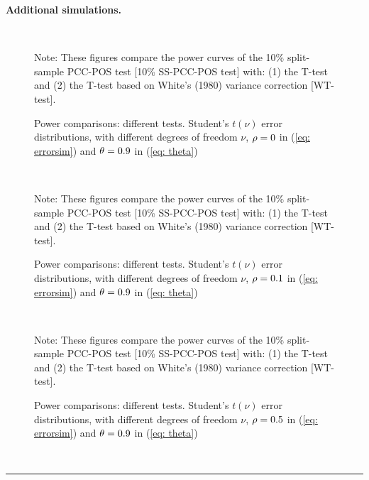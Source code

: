 \documentclass[harvard,11pt]{article}
\newenvironment{proof}[1][Proof]{\textbf{#1.} }{\  \rule{0.5em}{0.5em}}
\begin{document}
\begin{proof}[Additional simulations]

\begin{figure}[tbph]
\caption{Power comparisons: different tests. Student's $t(\nu)$ error distributions, with
different degrees of freedom $\nu$, $\protect\rho=0$ in (\protect\ref{eq: errorsim}) and $\protect%
\theta =0.9$ in (\protect\ref{eq: theta})}
\begin{center}
 \\[0pt]
\end{center}
\doublespacing
Note: These figures compare the power curves of the 10\% split-sample PCC-POS test
[10\% SS-PCC-POS test] with: (1) the T-test and (2) the T-test based
on White's (1980) variance correction [WT-test]. 
\label{fig: c21}
\end{figure}
\FloatBarrier

\begin{figure}[tbph]
\caption{Power comparisons: different tests. Student's $t(\nu)$ error distributions, with
different degrees of freedom $\nu$, $\protect\rho=0.1$ in (\protect\ref{eq: errorsim}) and $\protect%
\theta =0.9$ in (\protect\ref{eq: theta})}
\begin{center}
 \\[0pt]
\end{center}
\doublespacing
Note: These figures compare the power curves of the 10\% split-sample PCC-POS test
[10\% SS-PCC-POS test] with: (1) the T-test and (2) the T-test based
on White's (1980) variance correction [WT-test]. 
\label{fig: c22}
\end{figure}
\FloatBarrier

\begin{figure}[tbph]
\caption{Power comparisons: different tests. Student's $t(\nu)$ error distributions, with
different degrees of freedom $\nu$, $\protect\rho=0.5$ in (\protect\ref{eq: errorsim}) and $\protect%
\theta =0.9$ in (\protect\ref{eq: theta})}
\begin{center}
 \\[0pt]
\end{center}
\doublespacing
Note: These figures compare the power curves of the 10\% split-sample PCC-POS test
[10\% SS-PCC-POS test] with: (1) the T-test and (2) the T-test based
on White's (1980) variance correction [WT-test].  
\label{fig: c23}
\end{figure}
\FloatBarrier


\end{proof}
\end{document}
